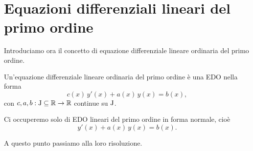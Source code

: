\documentclass[../../analisi2]{subfiles}
\begin{document}
    \chapter{Equazioni differenziali lineari del primo ordine}

        Introduciamo ora il concetto di equazione differenziale lineare ordinaria del primo ordine.

        \begin{definizione}
            Un'equazione differenziale lineare ordinaria del primo ordine è una EDO nella forma
            \[
                c(x) \, y'(x) + a(x) \, y(x) = b(x),
            \]
            con \(c, a, b : \mathrm{J} \subseteq \mathbb{R} \to \mathbb{R}\) continue su \(\mathrm{J}\).

            Ci occuperemo solo di EDO lineari del primo ordine in forma normale, cioè
            \[
                y'(x) + a(x) \, y(x) = b(x).
            \]
        \end{definizione}

        A questo punto passiamo alla loro risoluzione.
\end{document}
